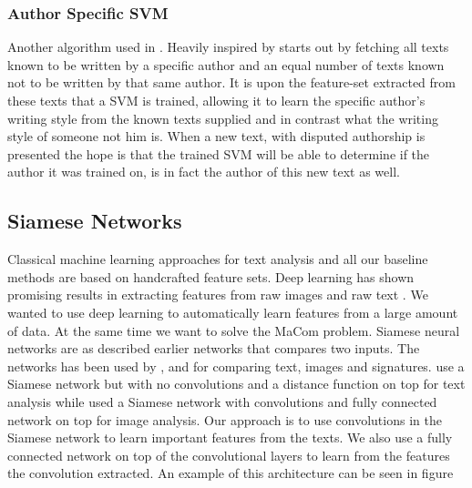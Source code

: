 \subsubsection{Author Specific SVM}

Another algorithm used in \cite{US}. Heavily inspired by \cite{hansen2014}
starts out by fetching all texts known to be written by a specific author and an
equal number of texts known not to be written by that same author. It is upon
the feature-set extracted from these texts that a \gls{SVM} is trained, allowing
it to learn the specific author's writing style from the known texts supplied
and in contrast what the writing style of someone not him is. When a new text,
with disputed authorship is presented the hope is that the trained \gls{SVM}
will be able to determine if the author it was trained on, is in fact the author
of this new text as well.


\subsection{Siamese Networks}

Classical machine learning approaches for text analysis and all our baseline
methods are based on handcrafted feature sets. Deep learning has shown
promising results in extracting features from raw images and raw text
\cite{hongxiaosunyuan}. We wanted to use deep learning to automatically learn
features from a large amount of data. At the same time we want to solve the
MaCom problem. Siamese neural networks are as described earlier networks that
compares two inputs. The networks has been used by \cite{Koch2015SiameseNN},
\cite{NIPS1993_769} and \cite{qian:2018} for comparing text, images and
signatures. \cite{qian:2018} use a Siamese network but with no convolutions and
a distance function on top for text analysis while \cite{Koch2015SiameseNN}
used a Siamese network with convolutions and fully connected network on top for
image analysis. Our approach is to use convolutions in the Siamese network to
learn important features from the texts. We also use a fully connected network
on top of the convolutional layers to learn from the features the convolution
extracted. An example of this architecture can be seen in figure


